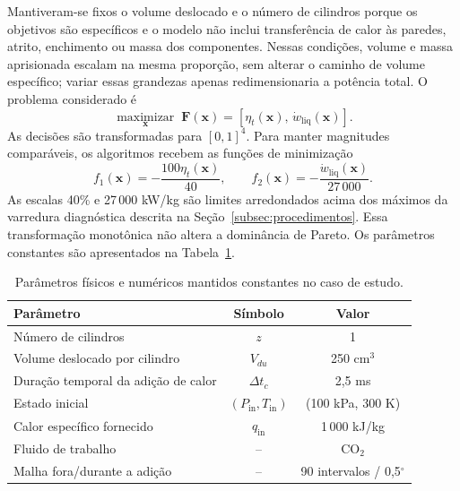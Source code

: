 \documentclass[a4paper,11pt]{article}
\begin{document}
Mantiveram-se fixos o volume deslocado e o número de cilindros porque os
objetivos são específicos e o modelo não inclui transferência de calor às
paredes, atrito, enchimento ou massa dos componentes. Nessas condições, volume
e massa aprisionada escalam na mesma proporção, sem alterar o caminho de volume
específico; variar essas grandezas apenas redimensionaria a potência total. O
problema considerado é
\begin{equation}
\underset{\mathbf{x}}{\operatorname{maximizar}}\;
\mathbf{F}(\mathbf{x})=
\left[\eta_t(\mathbf{x}),\,\dot w_{\mathrm{liq}}(\mathbf{x})\right].
\label{eq:objetivos-fisicos}
\end{equation}
As decisões são transformadas para $[0,1]^4$. Para manter magnitudes
comparáveis, os algoritmos recebem as funções de minimização
\begin{equation}
f_1(\mathbf{x})=-\frac{100\eta_t(\mathbf{x})}{40},
\qquad
f_2(\mathbf{x})=-\frac{\dot w_{\mathrm{liq}}(\mathbf{x})}{27\,000}.
\label{eq:objetivos-computacionais}
\end{equation}
As escalas 40\% e 27\,000 kW/kg são limites arredondados acima dos máximos da
varredura diagnóstica descrita na Seção~\ref{subsec:procedimentos}. Essa
transformação monotônica não altera a dominância de Pareto.
Os parâmetros constantes são apresentados na Tabela~\ref{tab:parametros-constantes}.

\begin{table}[htbp]
\centering
\caption{Parâmetros físicos e numéricos mantidos constantes no caso de estudo.}
\label{tab:parametros-constantes}
\small
\begin{tabular}{@{}lcc@{}}
\toprule
\textbf{Parâmetro} & \textbf{Símbolo} & \textbf{Valor} \\
\midrule
Número de cilindros & $z$ & 1 \\
Volume deslocado por cilindro & $V_{du}$ & 250 cm$^3$ \\
Duração temporal da adição de calor & $\Delta t_c$ & 2,5 ms \\
Estado inicial & $(P_{\mathrm{in}},T_{\mathrm{in}})$ & (100 kPa, 300 K) \\
Calor específico fornecido & $q_{\mathrm{in}}$ & 1\,000 kJ/kg \\
Fluido de trabalho & -- & CO$_2$ \\
Malha fora/durante a adição & -- & 90 intervalos / 0,5$^\circ$ \\
\bottomrule
\end{tabular}
\end{table}
\end{document}
